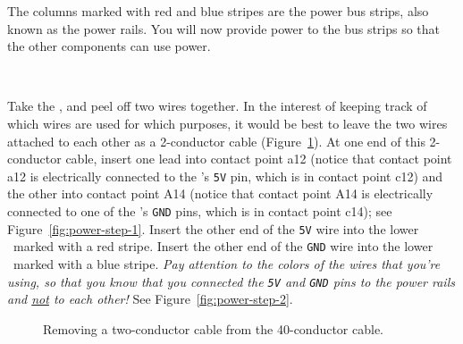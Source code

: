 The columns marked with red and blue stripes are the power bus strips, also known as the power rails.
You will now provide power to the bus strips so that the other components can use power.

\disconnect\

Take the \rainbow, and peel off two wires together.
In the interest of keeping track of which wires are used for which purposes, it would be best to leave the two wires attached to each other as a 2-conductor cable (Figure~\ref{fig:two-wires}).
At one end of this 2-conductor cable, insert one lead into contact point a12 (notice that contact point a12 is electrically connected to the \developmentboard's \texttt{5V} pin, which is in contact point c12) and the other into contact point A14 (notice that contact point A14 is electrically connected to one of the \developmentboard's \texttt{GND} pins, which is in contact point c14); see Figure~\ref{fig:power-step-1}.
Insert the other end of the \texttt{5V} wire into the lower \power\ marked with a red stripe.
Insert the other end of the \texttt{GND} wire into the lower \ground\ marked with a blue stripe.
\textit{Pay attention to the colors of the wires that you're using, so that you know that you connected the \texttt{5V} and \texttt{GND} pins to the power rails and \underline{not} to each other!}
See Figure~\ref{fig:power-step-2}.

\begin{figure}
    \centering
    \hfil
    \caption{Removing a two-conductor cable from the 40-conductor cable.\label{fig:two-wires}}
\end{figure}

